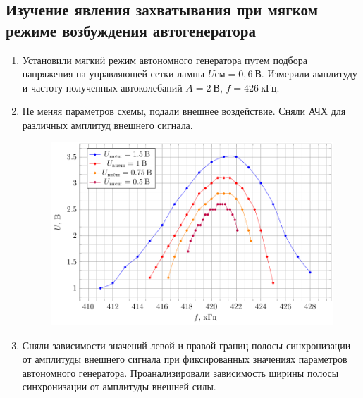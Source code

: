 \documentclass[a4paper,14pt]{extarticle}
\begin{document}
\subsection*{Изучение явления захватывания при мягком режиме возбуждения автогенератора}
\begin{enumerate}
	\item 
	Установили мягкий режим автономного генератора путем подбора напряжения на управляющей сетки лампы $U\text{см}=0,6\:\text{В}$. Измерили амплитуду и частоту полученных автоколебаний $A=2\:\text{В}$, $f=426\:\text{кГц}$.
	\item
	Не меняя параметров схемы, подали внешнее воздействие. Сняли АЧХ для различных амплитуд внешнего сигнала. 
\begin{figure}[H]
	\centering
	\includegraphics[width=\linewidth]{plots/fig2_comm}
\end{figure}
	\item
	Сняли зависимости значений левой и правой границ полосы синхронизации от амплитуды внешнего сигнала при фиксированных значениях параметров автономного генератора. Проанализировали зависимость ширины полосы синхронизации от амплитуды внешней силы.

\end{enumerate}
\end{document}
